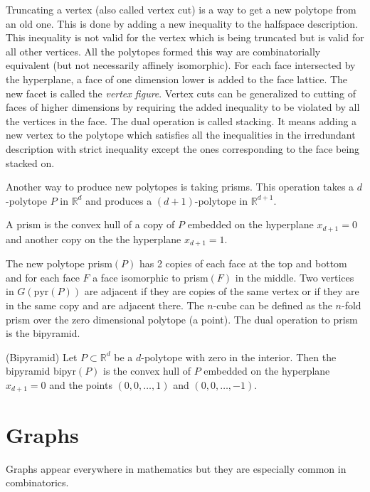 Truncating a vertex (also called vertex cut) is a way to get a new polytope 
from an old one. This is 
done by adding a new inequality to the halfspace description. This inequality 
is not 
valid for the vertex which is being truncated but is valid for all other 
vertices. All 
the polytopes formed this way are combinatorially equivalent (but not 
necessarily affinely isomorphic). For each face intersected by the hyperplane, 
a face of one dimension lower is added to the face lattice. The new facet is 
called the \textit{vertex figure}. Vertex cuts can be generalized to cutting of 
faces of higher dimensions by requiring the added inequality to be violated by 
all the vertices in the face. The dual operation is called stacking. 
It means adding a new vertex to the polytope which satisfies all the 
inequalities in the irredundant description with strict inequality except the 
ones corresponding to the face being stacked on.

Another way to produce new polytopes is taking prisms. This operation takes a 
$d$-polytope $P$ in $\mathbb{R}^d$ and produces a $(d+1)$-polytope in 
$\mathbb{R}^{d+1}$. 
\begin{definition}
 A prism is the convex hull of a copy of $P$ embedded on the hyperplane 
$x_{d+1} = 0$ and another copy on the the hyperplane $x_{d+1} = 1$.
\end{definition}

 The new polytope prism$(P)$ has 2 copies of 
each face at the top and bottom and for each face $F$ a face isomorphic to 
prism$(F)$ in the middle. Two vertices in $G(\text{pyr}(P))$ are adjacent if 
they are copies of the same vertex or if they are in the same copy and are 
adjacent there. 
The $n$-cube can be defined as the $n$-fold 
prism over the zero dimensional polytope (a point). The dual operation to prism 
is the bipyramid. 
\begin{definition}
 (Bipyramid) Let $P\subset \mathbb{R}^d$ be a $d$-polytope with zero in the 
interior. Then the bipyramid bipyr$(P)$ is the convex hull of $P$ embedded on 
the hyperplane $x_{d+1} = 0$ and the points $(0,0,\dots, 1)$ and $(0,0,\dots, 
-1)$.
\end{definition}

\section{Graphs}

Graphs appear everywhere in mathematics but they are especially common in 
combinatorics. 

